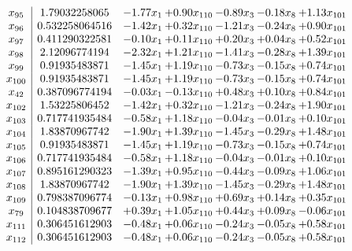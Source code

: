 \documentclass[8pt]{article}
\begin{document}
\[\begin{array}{c| c c@{\hskip 2pt} c@{\hskip 2pt} c@{\hskip 2pt} c@{\hskip 2pt} c@{\hskip 2pt} }
 x_{95}   &  1.79032258065 & -1.77 x_{1} & +  0.90 x_{110} & -0.89 x_{3} & -0.18 x_{8} & +  1.13 x_{101}\\
 x_{96}   &  0.532258064516 & -1.42 x_{1} & +  0.32 x_{110} & -1.21 x_{3} & -0.24 x_{8} & +  0.90 x_{101}\\
 x_{97}   &  0.411290322581 & -0.10 x_{1} & +  0.11 x_{110} & +  0.20 x_{3} & +  0.04 x_{8} & +  0.52 x_{101}\\
 x_{98}   &  2.12096774194 & -2.32 x_{1} & +  1.21 x_{110} & -1.41 x_{3} & -0.28 x_{8} & +  1.39 x_{101}\\
 x_{99}   &  0.91935483871 & -1.45 x_{1} & +  1.19 x_{110} & -0.73 x_{3} & -0.15 x_{8} & +  0.74 x_{101}\\
 x_{100}   &  0.91935483871 & -1.45 x_{1} & +  1.19 x_{110} & -0.73 x_{3} & -0.15 x_{8} & +  0.74 x_{101}\\
 x_{42}   &  0.387096774194 & -0.03 x_{1} & -0.13 x_{110} & +  0.48 x_{3} & +  0.10 x_{8} & +  0.84 x_{101}\\
 x_{102}   &  1.53225806452 & -1.42 x_{1} & +  0.32 x_{110} & -1.21 x_{3} & -0.24 x_{8} & +  1.90 x_{101}\\
 x_{103}   &  0.717741935484 & -0.58 x_{1} & +  1.18 x_{110} & -0.04 x_{3} & -0.01 x_{8} & +  0.10 x_{101}\\
 x_{104}   &  1.83870967742 & -1.90 x_{1} & +  1.39 x_{110} & -1.45 x_{3} & -0.29 x_{8} & +  1.48 x_{101}\\
 x_{105}   &  0.91935483871 & -1.45 x_{1} & +  1.19 x_{110} & -0.73 x_{3} & -0.15 x_{8} & +  0.74 x_{101}\\
 x_{106}   &  0.717741935484 & -0.58 x_{1} & +  1.18 x_{110} & -0.04 x_{3} & -0.01 x_{8} & +  0.10 x_{101}\\
 x_{107}   &  0.895161290323 & -1.39 x_{1} & +  0.95 x_{110} & -0.44 x_{3} & -0.09 x_{8} & +  1.06 x_{101}\\
 x_{108}   &  1.83870967742 & -1.90 x_{1} & +  1.39 x_{110} & -1.45 x_{3} & -0.29 x_{8} & +  1.48 x_{101}\\
 x_{109}   &  0.798387096774 & -0.13 x_{1} & +  0.98 x_{110} & +  0.69 x_{3} & +  0.14 x_{8} & +  0.35 x_{101}\\
 x_{79}   &  0.104838709677 & +  0.39 x_{1} & +  1.05 x_{110} & +  0.44 x_{3} & +  0.09 x_{8} & -0.06 x_{101}\\
 x_{111}   &  0.306451612903 & -0.48 x_{1} & +  0.06 x_{110} & -0.24 x_{3} & -0.05 x_{8} & +  0.58 x_{101}\\
 x_{112}   &  0.306451612903 & -0.48 x_{1} & +  0.06 x_{110} & -0.24 x_{3} & -0.05 x_{8} & +  0.58 x_{101}\\

\end{array}\]
\end{document}
